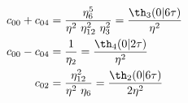 \begin{equation*}
  \begin{split}
     c_{00} +c_{04} &= {\eta_{6}^5 \over \eta^2 ~\eta_{12}^2
     ~\eta_{3}^2 } = {\th_3(0|6\tau)\over \eta^2} \\
     c_{00} -c_{04} &= {1 \over \eta_{2}} =
     {\th_4(0|2\tau)\over \eta^2}\\
     c_{02} &=  {\eta_{12}^2 \over \eta^2 ~\eta_{6}} =
     {\th_2(0|6\tau)\over 2\eta^2}\\
  \end{split}
\end{equation*}

